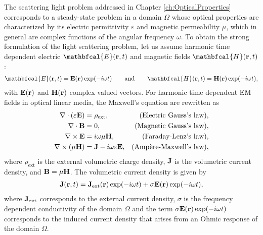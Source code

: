 
The scattering light problem addressed in Chapter \ref{ch:OpticalProperties} corresponds to a steady-state problem in a domain $\Omega$ whose optical properties are characterized by its electric permittivity $\varepsilon$ and magnetic permeability $\mu$, which in general are complex functions of the angular frequency $\omega$. To obtain the strong formulation of the light scattering problem, let us assume harmonic time dependent electric $\mathbfcal{E}(\vb{r},t)$ and magnetic fields $\mathbfcal{H}(\vb{r},t)$:
%
\begin{align}
    \mathbfcal{E}(\vb{r},t) = \vb{E}(\vb{r})\exp(-i\omega t)
        \qquad
        \text{and}
        \qquad
    \mathbfcal{H}(\vb{r},t) =  \vb{H}(\vb{r}) \exp(-i\omega t),
\end{align}
%
with $ \vb{E}(\vb{r})$ and $ \vb{H}(\vb{r})$ complex valued vectors. For harmonic time dependent EM fields in optical linear media, the Maxwell's equation are rewritten as \cite{jackson_classical_1999}
%
%
%
\begin{subequations}
    \label{eq:MaxwellsEq}
\begin{align}
    \nabla \cdot \qty(\varepsilon \vb{E})  &= \rho_\text{ext},  &\mbox{(Electric Gauss's law)},\\
    \nabla \cdot   \vb{B} &= 0, & \mbox{(Magnetic Gauss's law)},
            \label{eq:GaussM}\\
    \nabla \times \vb{E}  &= i\omega \mu \vb{H},  &  \mbox{(Faraday-Lenz's law)},\\
    \nabla \times \qty(\mu \vb{H})  &= \vb{J} - i\omega \varepsilon \vb{E}, & \mbox{(Ampère-Maxwell's law)},
\end{align}
\end{subequations}
%
where  $\rho_\text{ext}$ is the external volumetric charge density, $\vb{J}$ is the volumetric current density, and  $\vb{B} = \mu \vb{H}$. The volumetric current density is given by \cite{jackson_classical_1999}
%
\begin{align}
    \vb{J}(\vb{r},t) = \vb{J}_\text{ext}(\vb{r})\exp(-i\omega t) + \sigma \vb{E}(\vb{r})\exp(-i\omega t),
    \label{eq:ohmic}
\end{align}
%
where $\vb{J}_\text{ext}$ corresponds to the external current density, $\sigma$ is the frequency dependent conductivity of the domain $\Omega$ and the term $\sigma \vb{E}(\vb{r})\exp(-i\omega t)$ corresponds to the induced current density that arises from an Ohmic response of the domain $\Omega$.

